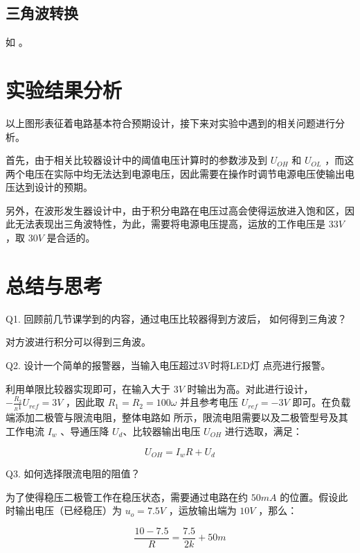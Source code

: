 \documentclass[lang=cn,11pt,a4paper,cite=authoryear]{elegantpaper}
\begin{document}

\subsection{三角波转换}

如  。


\section{实验结果分析}

以上图形表征着电路基本符合预期设计，接下来对实验中遇到的相关问题进行分析。

首先，由于相关比较器设计中的阈值电压计算时的参数涉及到 \(U_{OH}\) 和 \(U_{OL}\) ，而这两个电压在实际中均无法达到电源电压，因此需要在操作时调节电源电压使输出电压达到设计的预期。

另外，在波形发生器设计中，由于积分电路在电压过高会使得运放进入饱和区，因此无法表现出三角波特性，为此，需要将电源电压提高，运放的工作电压是 \(33 V\) ，取 \(30 V\) 是合适的。


\section{总结与思考}


Q1. 回顾前几节课学到的内容，通过电压比较器得到方波后，
如何得到三角波？

对方波进行积分可以得到三角波。

Q2. 设计一个简单的报警器，当输入电压超过3V时将LED灯
点亮进行报警。

利用单限比较器实现即可，在输入大于 \(3 V\) 时输出为高。对此进行设计，\(- \frac{R_2}{_R1} U_{ref} = 3 V \) ，因此取  \(R_1 = R_2 = 100 \omega \) 并且参考电压 \(U_{ref} = - 3 V\) 即可。在负载端添加二极管与限流电阻，整体电路如  所示，限流电阻需要以及二极管型号及其工作电流 \(I_w\) 、导通压降 \(U_{d}\)、比较器输出电压 \(U_{OH}\)  进行选取，满足：

\[U_{OH } = I_w R + U_d \]



Q3. 如何选择限流电阻的阻值？


为了使得稳压二极管工作在稳压状态，需要通过电路在约 \(50 mA\) 的位置。假设此时输出电压（已经稳压）为 \(u_o = 7.5 V\) ，运放输出端为 \(10 V\) ，那么：

\[\frac{10 - 7.5}{R} = \frac{7.5}{2 k} + 50 m\]
\end{document}
